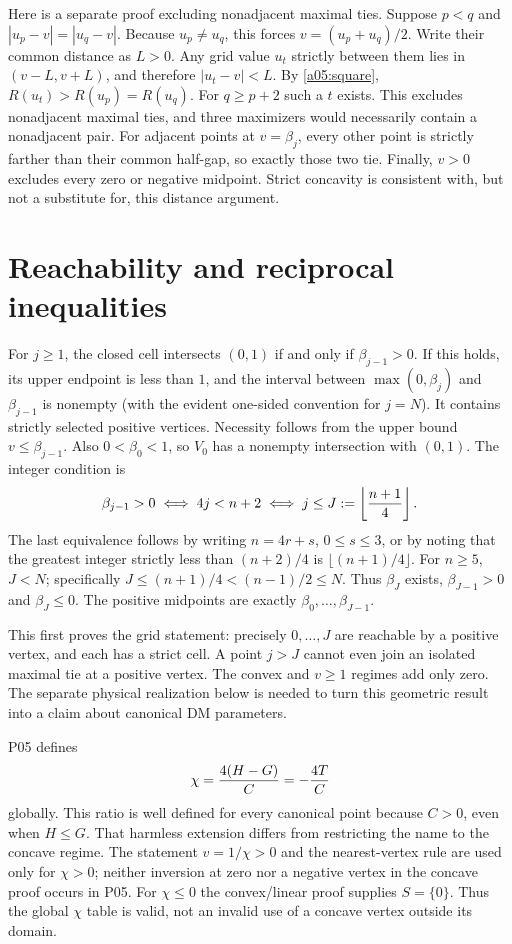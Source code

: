 \documentclass[11pt]{article}
\begin{document}
Here is a separate proof excluding nonadjacent maximal ties. Suppose
$p<q$ and $|u_p-v|=|u_q-v|$. Because $u_p\ne u_q$, this forces
$v=(u_p+u_q)/2$. Write their common distance as $L>0$. Any grid value
$u_t$ strictly between them lies in $(v-L,v+L)$, and therefore
$|u_t-v|<L$. By \eqref{a05:square}, $R(u_t)>R(u_p)=R(u_q)$.
For $q\ge p+2$ such a $t$ exists. This excludes nonadjacent maximal
ties, and three maximizers would necessarily contain a nonadjacent pair.
For adjacent points at $v=\beta_j$, every other point is strictly
farther than their common half-gap, so exactly those two tie. Finally,
$v>0$ excludes every zero or negative midpoint. Strict concavity is
consistent with, but not a substitute for, this distance argument.

\section{Reachability and reciprocal inequalities}
For $j\ge1$, the closed cell intersects $(0,1)$ if and only if
$\beta_{j-1}>0$. If this holds, its upper endpoint is less than $1$,
and the interval between $\max(0,\beta_j)$ and $\beta_{j-1}$ is
nonempty (with the evident one-sided convention for $j=N$). It contains
strictly selected positive vertices. Necessity follows from the upper
bound $v\le\beta_{j-1}$. Also $0<\beta_0<1$, so $V_0$ has a
nonempty intersection with $(0,1)$.
The integer condition is
\[
 \beta_{j-1}>0\iff4j<n+2
 \iff j\le J:=\left\lfloor{n+1\over4}\right\rfloor.
\]
The last equivalence follows by writing $n=4r+s$, $0\le s\le3$, or
by noting that the greatest integer strictly less than $(n+2)/4$ is
$\lfloor(n+1)/4\rfloor$. For $n\ge5$, $J<N$; specifically
$J\le(n+1)/4<(n-1)/2\le N$. Thus $\beta_J$ exists,
$\beta_{J-1}>0$ and $\beta_J\le0$. The positive midpoints are exactly
$\beta_0,\ldots,\beta_{J-1}$.

This first proves the grid statement: precisely $0,\ldots,J$ are
reachable by a positive vertex, and each has a strict cell. A point
$j>J$ cannot even join an isolated maximal tie at a positive vertex.
The convex and $v\ge1$ regimes add only zero. The separate physical
realization below is needed to turn this geometric result into a claim
about canonical DM parameters.

P05 defines
\[
 \chi={4(H-G)\over C}=-{4T\over C}
\]
globally. This ratio is well defined for every canonical point because
$C>0$, even when $H\le G$. That harmless extension differs from
restricting the name to the concave regime. The statement
$v=1/\chi>0$ and the nearest-vertex rule are used only for $\chi>0$;
neither inversion at zero nor a negative vertex in the concave proof
occurs in P05. For $\chi\le0$ the convex/linear proof supplies $S=\{0\}$.
Thus the global $\chi$ table is valid, not an invalid use of a concave
vertex outside its domain.
\end{document}
